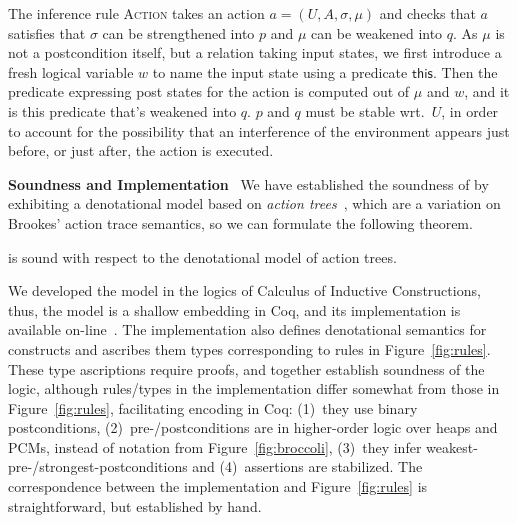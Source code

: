 
The inference rule \textsc{Action} takes an action $a = (U, A, \sigma,
\mu)$ and checks that $a$ satisfies that $\sigma$ can be strengthened
into $p$ and $\mu$ can be weakened into $q$. As $\mu$ is not a
postcondition itself, but a relation taking input states, we first
introduce a fresh logical variable $w$ to name the input state using a
predicate $\mathsf{this}$. Then the predicate expressing post states
for the action is computed out of $\mu$ and $w$, and it is this
predicate that's weakened into $q$. $p$ and $q$ must be stable
wrt.~$U$,
%
in order to account for the possibility that an interference of the
environment appears just before, or just after, the action is
executed.

\vspace{4pt}

\noindent\textbf{Soundness and Implementation}~
%
We have established the soundness of \SCST by exhibiting a
denotational model based on \emph{action
  trees}~\cite{LeyWild-Nanevski:POPL13,fcsl-coqscripts}, which are a
variation on Brookes' action trace semantics, so we can formulate the
following theorem.
%
\begin{theorem} 
  \SCST is sound with respect to the denotational model of action
  trees.
\end{theorem}
%
We developed the model in the logics of Calculus of Inductive
Constructions, thus, the model is a shallow embedding in Coq, and its
implementation is available on-line~\cite{fcsl-coqscripts}.
%
The implementation also defines denotational semantics for constructs
and ascribes them types corresponding to rules in
Figure~\ref{fig:rules}. These type ascriptions require proofs, and
together establish soundness of the logic, although rules/types in the
implementation differ somewhat from those in Figure~\ref{fig:rules},
facilitating encoding in Coq: (1)~they use binary postconditions,
(2)~pre-/postconditions are in higher-order logic over heaps and PCMs,
instead of notation from Figure~\ref{fig:broccoli}, (3)~they infer
weakest-pre-/strongest-postconditions and (4)~assertions are
stabilized. The correspondence between the implementation and
Figure~\ref{fig:rules} is straightforward, but established by hand.


%



